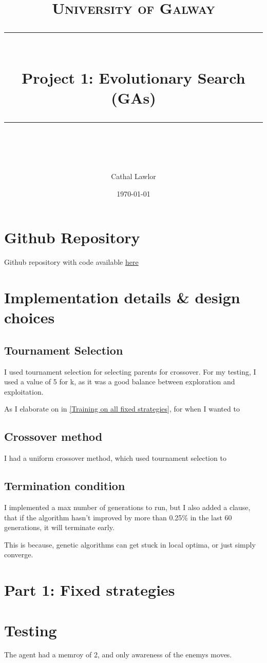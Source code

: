 \documentclass[11pt]{scrartcl} %
\title{	
	\normalfont\normalsize
	\textsc{University of Galway}\\ %
	\vspace{25pt} %
	\rule{\linewidth}{0.5pt}\\ %
	\vspace{20pt} %
	{\huge  Project 1: Evolutionary Search (GAs)}\\ %
	\vspace{12pt} %
	\rule{\linewidth}{2pt}\\ %
	\vspace{12pt} %
}
\author{\LARGE Cathal Lawlor} %
\date{\normalsize\today} %
\begin{document}
\maketitle %

\section{Github Repository}
Github repository with code available \href{https://github.com/Laan33/ai_project_1}{here}

\section{Implementation details \& design choices}

\subsection{Tournament Selection}
I used tournament selection for selecting parents for crossover. For my testing, I used a value of 5 for k, as it was a good balance between exploration and exploitation.

As I elaborate on in \ref{Training on all fixed strategies}, for when I wanted to 

\subsection{Crossover method}
I had a uniform crossover method, which used tournament selection to


\subsection{Termination condition}
I implemented a max number of generations to run, but I also added a clause, that if the algorithm hasn't improved by more than 0.25\% in the last 60 generations, it will terminate early.

This is because, genetic algorithms can get stuck in local optima, or just simply converge.

\section{Part 1: Fixed strategies}
\section{Testing}
The agent had a memroy of 2, and only awareness of the enemys moves.
\end{document}
